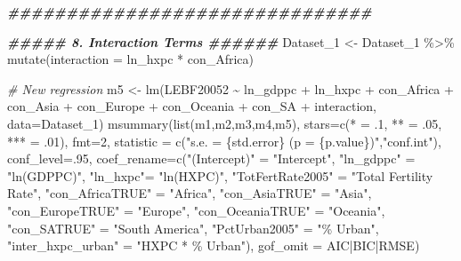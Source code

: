 \documentclass[
]{article}
\newenvironment{Shaded}{\begin{snugshade}}{\end{snugshade}}
\newcommand{\AttributeTok}[1]{\textcolor[rgb]{0.77,0.63,0.00}{#1}}
\newcommand{\CommentTok}[1]{\textcolor[rgb]{0.56,0.35,0.01}{\textit{#1}}}
\newcommand{\DecValTok}[1]{\textcolor[rgb]{0.00,0.00,0.81}{#1}}
\newcommand{\DocumentationTok}[1]{\textcolor[rgb]{0.56,0.35,0.01}{\textbf{\textit{#1}}}}
\newcommand{\FunctionTok}[1]{\textcolor[rgb]{0.00,0.00,0.00}{#1}}
\newcommand{\NormalTok}[1]{#1}
\newcommand{\OtherTok}[1]{\textcolor[rgb]{0.56,0.35,0.01}{#1}}
\newcommand{\SpecialCharTok}[1]{\textcolor[rgb]{0.00,0.00,0.00}{#1}}
\newcommand{\StringTok}[1]{\textcolor[rgb]{0.31,0.60,0.02}{#1}}
\begin{document}
\begin{Shaded}
\begin{Highlighting}[]
\DocumentationTok{\#\#\#\#\#\#\#\#\#\#\#\#\#\#\#\#\#\#\#\#\#\#\#\#\#\#\#\#\#\#\#}


\DocumentationTok{\#\#\#\#\# 8. Interaction Terms \#\#\#\#\#\#}
\NormalTok{Dataset\_1 }\OtherTok{\textless{}{-}}\NormalTok{ Dataset\_1 }\SpecialCharTok{\%\textgreater{}\%} \FunctionTok{mutate}\NormalTok{(}\AttributeTok{interaction =}\NormalTok{ ln\_hxpc }\SpecialCharTok{*}\NormalTok{ con\_Africa)}

\CommentTok{\# New regression}
\NormalTok{m5 }\OtherTok{\textless{}{-}} \FunctionTok{lm}\NormalTok{(LEBF20052 }\SpecialCharTok{\textasciitilde{}}\NormalTok{ ln\_gdppc }\SpecialCharTok{+}\NormalTok{ ln\_hxpc }\SpecialCharTok{+}\NormalTok{ con\_Africa }\SpecialCharTok{+}\NormalTok{ con\_Asia }\SpecialCharTok{+}\NormalTok{ con\_Europe }\SpecialCharTok{+}\NormalTok{ con\_Oceania }\SpecialCharTok{+}\NormalTok{ con\_SA }\SpecialCharTok{+}\NormalTok{ interaction, }\AttributeTok{data=}\NormalTok{Dataset\_1)}
\FunctionTok{msummary}\NormalTok{(}\FunctionTok{list}\NormalTok{(m1,m2,m3,m4,m5),}
         \AttributeTok{stars=}\FunctionTok{c}\NormalTok{(}\StringTok{\textquotesingle{}*\textquotesingle{}} \OtherTok{=}\NormalTok{ .}\DecValTok{1}\NormalTok{, }\StringTok{\textquotesingle{}**\textquotesingle{}} \OtherTok{=}\NormalTok{ .}\DecValTok{05}\NormalTok{, }\StringTok{\textquotesingle{}***\textquotesingle{}} \OtherTok{=}\NormalTok{ .}\DecValTok{01}\NormalTok{),}
         \AttributeTok{fmt=}\DecValTok{2}\NormalTok{,}
         \AttributeTok{statistic =} \FunctionTok{c}\NormalTok{(}\StringTok{"s.e. = \{std.error\} (p = \{p.value\})"}\NormalTok{,}\StringTok{"conf.int"}\NormalTok{),}
         \AttributeTok{conf\_level=}\NormalTok{.}\DecValTok{95}\NormalTok{,}
         \AttributeTok{coef\_rename=}\FunctionTok{c}\NormalTok{(}\StringTok{"(Intercept)"} \OtherTok{=} \StringTok{"Intercept"}\NormalTok{, }\StringTok{"ln\_gdppc"} \OtherTok{=} \StringTok{"ln(GDPPC)"}\NormalTok{, }\StringTok{"ln\_hxpc"}\OtherTok{=} \StringTok{"ln(HXPC)"}\NormalTok{, }
                       \StringTok{"TotFertRate2005"} \OtherTok{=} \StringTok{"Total Fertility Rate"}\NormalTok{,}
                       \StringTok{"con\_AfricaTRUE"} \OtherTok{=} \StringTok{"Africa"}\NormalTok{, }\StringTok{"con\_AsiaTRUE"} \OtherTok{=} \StringTok{"Asia"}\NormalTok{, }\StringTok{"con\_EuropeTRUE"} \OtherTok{=} \StringTok{"Europe"}\NormalTok{,}
                       \StringTok{"con\_OceaniaTRUE"} \OtherTok{=} \StringTok{"Oceania"}\NormalTok{, }\StringTok{"con\_SATRUE"} \OtherTok{=} \StringTok{"South America"}\NormalTok{,}
                       \StringTok{"PctUrban2005"} \OtherTok{=} \StringTok{"\% Urban"}\NormalTok{, }\StringTok{"inter\_hxpc\_urban"} \OtherTok{=} \StringTok{"HXPC * \% Urban"}\NormalTok{),}
         \AttributeTok{gof\_omit =} \StringTok{\textquotesingle{}AIC|BIC|RMSE\textquotesingle{}}\NormalTok{) }
\end{Highlighting}
\end{Shaded}
\end{document}
